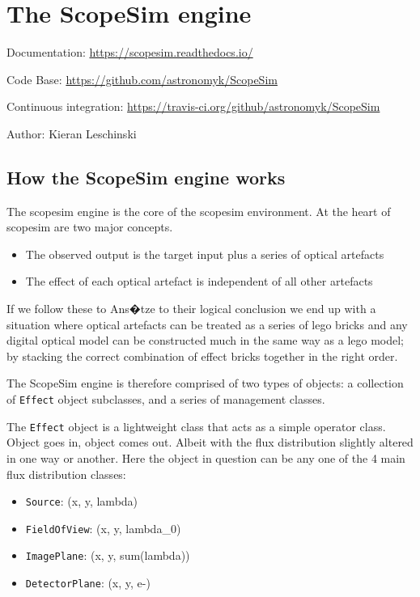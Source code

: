 

\section{The ScopeSim engine%
  \label{the-scopesim-engine}%
}

Documentation: \url{https://scopesim.readthedocs.io/}

Code Base: \url{https://github.com/astronomyk/ScopeSim}

Continuous integration: \url{https://travis-ci.org/github/astronomyk/ScopeSim}

Author: Kieran Leschinski


\subsection{How the ScopeSim engine works%
  \label{how-the-scopesim-engine-works}%
}

The scopesim engine is the core of the scopesim environment.
At the heart of scopesim are two major concepts.

\begin{itemize}
\item The observed output is the target input plus a series of optical artefacts

\item The effect of each optical artefact is independent of all other artefacts
\end{itemize}

If we follow these to Ans�tze to their logical conclusion we end up with a situation where optical artefacts can be treated as a series of \textquotedbl{}lego bricks\textquotedbl{} and any digital optical model can be constructed much in the same way as a lego model; by stacking the correct combination of effect \textquotedbl{}bricks\textquotedbl{} together in the right order.

The ScopeSim engine is therefore comprised of two types of objects: a collection of \texttt{Effect} object subclasses, and a series of \textquotedbl{}management\textquotedbl{} classes.

The \texttt{Effect} object is a lightweight class that acts as a simple operator class.
Object goes in, object comes out.
Albeit with the flux distribution slightly altered in one way or another.
Here the object in question can be any one of the 4 main flux distribution classes:

\begin{itemize}
\item \texttt{Source}: (x, y, lambda)

\item \texttt{FieldOfView}: (x, y, lambda\_0)

\item \texttt{ImagePlane}: (x, y, sum(lambda))

\item \texttt{DetectorPlane}: (x, y, e-)
\end{itemize}


